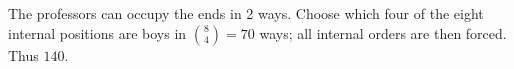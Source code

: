 The professors can occupy the ends in 2 ways. Choose which four of the eight internal positions are boys in $\binom84=70 $ ways; all internal orders are then forced. Thus $\boxed{140}$.
